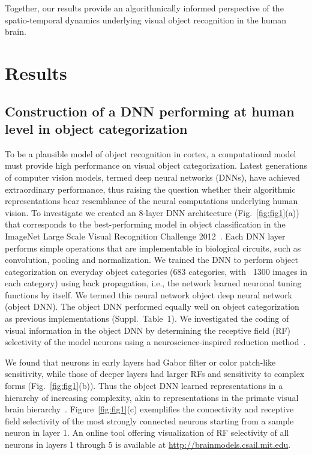 \documentclass[10pt,twocolumn,letterpaper]{article}
\begin{document}
Together, our results provide an algorithmically informed perspective of the spatio-temporal dynamics underlying visual object recognition in the human brain.

\section{Results}
\subsection{Construction of a DNN performing at human level in object categorization}
To be a plausible model of object recognition in cortex, a computational model must provide high performance on visual object categorization. Latest generations of computer vision models, termed deep neural networks (DNNs), have achieved extraordinary performance, thus raising the question whether their algorithmic representations bear resemblance of the neural computations underlying human vision. To investigate we created an 8-layer DNN architecture (Fig.~\ref{fig:fig1}(a)) that corresponds to the best-performing model in object classification in the ImageNet Large Scale Visual Recognition Challenge 2012~\cite{krizhevsky2012imagenet}. Each DNN layer performs simple operations that are implementable in biological circuits, such as convolution, pooling and normalization. We trained the DNN to perform object categorization on everyday object categories (683 categories, with ~1300 images in each category) using back propagation, i.e., the network learned neuronal tuning functions by itself. We termed this neural network object deep neural network (object DNN). The object DNN performed equally well on object categorization as previous implementations (Suppl.~Table~1). We investigated the coding of visual information in the object DNN by determining the receptive field (RF) selectivity of the model neurons using a neuroscience-inspired reduction method~\cite{scenecnn_iclr15}.

We found that neurons in early layers had Gabor filter or color patch-like sensitivity, while those of deeper layers had larger RFs and sensitivity to complex forms (Fig.~\ref{fig:fig1}(b)). Thus the object DNN learned representations in a hierarchy of increasing complexity, akin to representations in the primate visual brain hierarchy~\cite{kourtzi2011neural,dicarlo2012does}. Figure~\ref{fig:fig1}(c) exemplifies the connectivity and receptive field selectivity of the most strongly connected neurons starting from a sample neuron in layer 1. An online tool offering visualization of RF selectivity of all neurons in layers 1 through 5 is available at \href{http://brainmodels.csail.mit.edu}{http://brainmodels.csail.mit.edu}.
\end{document}
